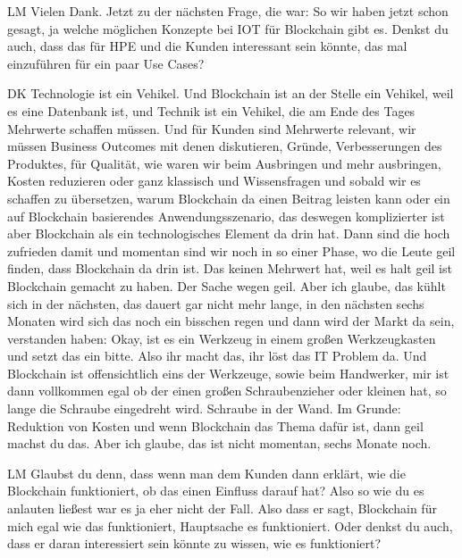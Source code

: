 \begin{xlist}
     \item[LM] Vielen Dank. Jetzt zu der nächsten Frage, die war: So wir haben jetzt schon gesagt, ja welche möglichen Konzepte bei IOT für Blockchain gibt es. Denkst du auch, dass das für HPE und die Kunden interessant sein könnte, das mal einzuführen für ein paar Use Cases?
     \item[DK] Technologie ist ein Vehikel. Und Blockchain ist an der Stelle ein Vehikel, weil es eine Datenbank ist, und Technik ist ein Vehikel, die am Ende des Tages Mehrwerte schaffen müssen.  Und für Kunden sind Mehrwerte relevant, wir müssen Business Outcomes mit denen diskutieren, Gründe, Verbesserungen des Produktes, für Qualität, wie waren wir beim Ausbringen und mehr ausbringen, Kosten reduzieren oder ganz klassisch und Wissensfragen und sobald wir es schaffen zu übersetzen, warum Blockchain da einen Beitrag leisten kann oder ein auf Blockchain basierendes Anwendungsszenario, das deswegen komplizierter ist aber Blockchain als ein technologisches Element da drin hat. Dann sind die hoch zufrieden damit und momentan sind wir noch in so einer Phase, wo die Leute geil finden, dass Blockchain da drin ist. Das keinen Mehrwert hat, weil es halt geil ist Blockchain gemacht zu haben. Der Sache wegen geil. Aber ich glaube, das kühlt sich in der nächsten, das dauert gar nicht mehr lange, in den nächsten sechs Monaten wird sich das noch ein bisschen regen und dann wird der Markt da sein, verstanden haben: Okay, ist es ein Werkzeug in einem großen Werkzeugkasten und setzt das ein bitte. Also ihr macht das, ihr löst das IT Problem da. Und Blockchain ist offensichtlich eins der Werkzeuge, sowie beim Handwerker, mir ist dann vollkommen egal ob der einen großen Schraubenzieher oder kleinen hat, so lange die Schraube eingedreht wird. Schraube in der Wand. Im Grunde: Reduktion von Kosten und wenn Blockchain das Thema dafür ist, dann geil machst du das. Aber ich glaube, das ist nicht momentan, sechs Monate noch.
     \item[LM] Glaubst du denn, dass wenn man dem Kunden dann erklärt, wie die Blockchain funktioniert, ob das einen Einfluss darauf hat? Also so wie du es anlauten ließest war es ja eher nicht der Fall. Also dass er sagt, Blockchain für mich egal wie das funktioniert, Hauptsache es funktioniert. Oder denkst du auch, dass er daran interessiert sein könnte zu wissen, wie es funktioniert? 

\end{xlist}
